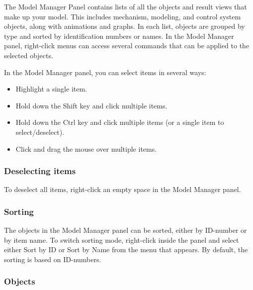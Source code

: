 The Model Manager Panel contains lists of all the objects and result views
that make up your model. This includes mechanism, modeling, and control
system objects, along with animations and graphs. In each list,
objects are grouped by type and sorted by identification numbers or names.
In the Model Manager panel, right-click menus can access several
commands that can be applied to the selected objects.



In the Model Manager panel, you can select items in several ways:
\begin{itemize}
\item Highlight a single item.
\item Hold down the Shift key and click multiple items.
\item Hold down the Ctrl key and click multiple items
  (or a single item to select/deselect).
\item Click and drag the mouse over multiple items.
\end{itemize}

\subsubsection{Deselecting items}

To deselect all items, right-click an empty space in the Model Manager panel.

\subsubsection{Sorting}

The objects in the Model Manager panel can be sorted, either by ID-number or
by item name. To switch sorting mode, right-click inside the panel and
select either Sort by ID or Sort by Name from the menu that appears.
By default, the sorting is based on ID-numbers.


\subsubsection{Objects}

